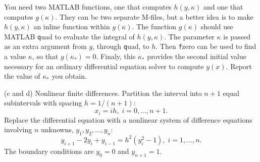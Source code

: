 \begin{description}
\[\]
You need two MATLAB functions, one that computes $h(y, \kappa)$ and one that computes $g(\kappa)$.  They can be two separate M-files, but a better idea is to make $h(y, \kappa)$ an inline function within $g(\kappa)$.  The function $g(\kappa)$ should use MATLAB {\texttt quad} to evaluate the integral of $h(y, \kappa)$.  The parameter $\kappa$ is passed as an extra argument from $g$, through {\texttt quad}, to $h$.  Then {\texttt fzero} can be used to find a value $\kappa$, so that $g(\kappa_\ast) = 0$.  Finaly, this $\kappa_\ast$ provides the second initial value necessary for an ordinary differential equation solver to compute $y(x)$.  Report the value of $\kappa_\ast$ you obtain.
\item{(c and d)}  Nonlinear finite differences.  Partition the interval into $n + 1$ equal subintervals with spacing $h = 1 / (n + 1)$:
\[
x_i = ih, \; i = 0, \ldots, n + 1.
\]
Replace the differential equation with a nonlinear system of difference equations involving $n$ unknowns, $y_1, y_2, \ldots, y_n$:
\[
y_{i + 1} - 2y_i + y_{i - 1} = h^2 (y^2_i - 1), \; i = 1, \ldots, n.
\]
The boundary conditions are $y_0 = 0$ and $y_{n + 1} = 1$.\\


\end{description}

